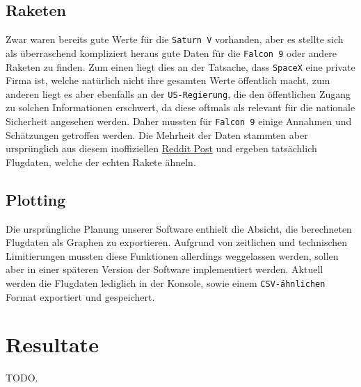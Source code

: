 \documentclass[11pt]{article}
\begin{document}
\subsection{Raketen}
\label{sec:orgcaf2288}
Zwar waren bereits gute Werte für die \texttt{Saturn V} vorhanden, aber es stellte sich
als überraschend kompliziert heraus gute Daten für die \texttt{Falcon 9} oder andere
Raketen zu finden. Zum einen liegt dies an der Tatsache, dass \texttt{SpaceX} eine
private Firma ist, welche natürlich nicht ihre gesamten Werte öffentlich macht,
zum anderen liegt es aber ebenfalls an der \texttt{US-Regierung}, die den öffentlichen
Zugang zu solchen Informationen erschwert, da diese oftmals als relevant für die
nationale Sicherheit angesehen werden. Daher mussten für \texttt{Falcon 9} einige
Annahmen und Schätzungen getroffen werden. Die Mehrheit der Daten stammten aber
ursprünglich aus diesem inoffiziellen \href{https://www.reddit.com/r/spacex/comments/3lsm0q/f9ft\_vs\_f9v11\_fuel\_mass\_flow\_rate\_isp/}{Reddit Post} und ergeben tatsächlich
Flugdaten, welche der echten Rakete ähneln.
\subsection{Plotting}
\label{sec:orge608555}
Die ursprüngliche Planung unserer Software enthielt die Absicht, die
berechneten Flugdaten als Graphen zu exportieren. Aufgrund von zeitlichen und
technischen Limitierungen mussten diese Funktionen allerdings weggelassen
werden, sollen aber in einer späteren Version der Software implementiert werden.
Aktuell werden die Flugdaten lediglich in der Konsole, sowie einem \texttt{CSV-ähnlichen}
Format exportiert und gespeichert.
\section{Resultate}
\label{sec:org6175036}
TODO.
\end{document}
